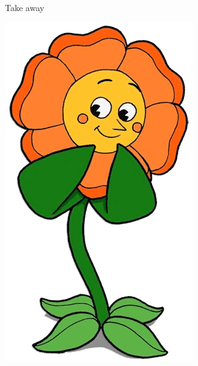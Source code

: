 \begin{frame}{Take away}
\begin{minipage}{0.4\linewidth}
        \centering
        \includegraphics[scale = 0.15]{pics/cagney.png}
    \end{minipage}
\end{frame}